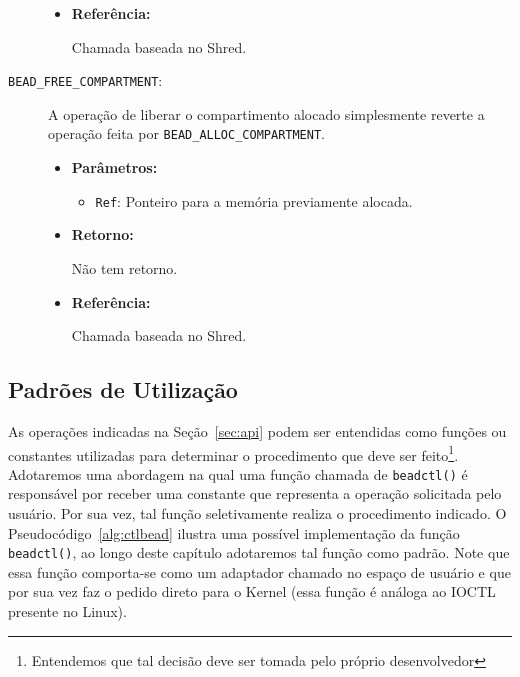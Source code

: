 \begin{description}
\begin{itemize}
    \item \textbf{Referência:}

Chamada baseada no Shred.

	\end{itemize}

  \item [\texttt{BEAD\_FREE\_COMPARTMENT}:]

A operação de liberar o compartimento alocado simplesmente reverte a operação
feita por \texttt{BEAD\_ALLOC\_COMPARTMENT}.

  \begin{itemize}
    \item \textbf{Parâmetros:}

    \begin{itemize}
      \item \texttt{Ref}: Ponteiro para a memória previamente alocada.
    \end{itemize}

    \item \textbf{Retorno:}

Não tem retorno.

    \item \textbf{Referência:}

Chamada baseada no Shred.

	\end{itemize}
\end{description}

\subsection{Padrões de Utilização}
As operações indicadas na Seção~\ref{sec:api} podem ser entendidas como funções
ou constantes utilizadas para determinar o procedimento que deve ser
feito\footnote{Entendemos que tal decisão deve ser tomada pelo próprio
desenvolvedor}. Adotaremos uma abordagem na qual uma função chamada de
\texttt{beadctl()} é responsável por receber uma constante que representa a
operação solicitada pelo usuário. Por sua vez, tal função seletivamente realiza
o procedimento indicado. O Pseudocódigo~\ref{alg:ctlbead} ilustra uma possível
implementação da função \texttt{beadctl()}, ao longo deste capítulo adotaremos
tal função como padrão. Note que essa função comporta-se como um adaptador
chamado no espaço de usuário e que por sua vez faz o pedido direto para o
Kernel (essa função é análoga ao IOCTL presente no Linux).


